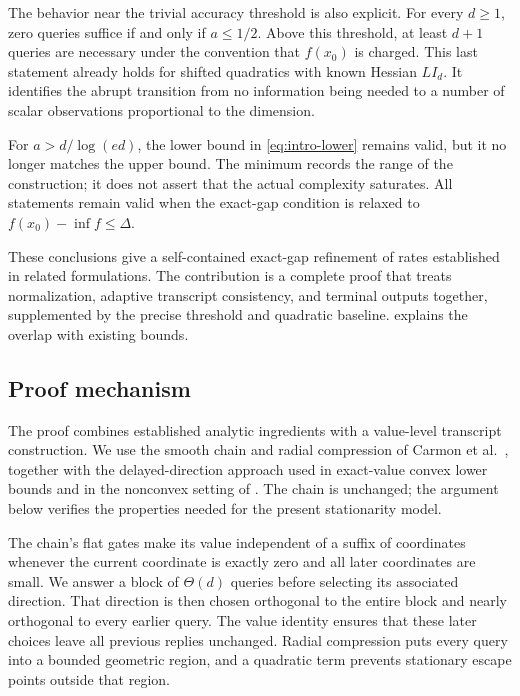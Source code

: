 \documentclass[11pt]{article}
\numberwithin{equation}{section}
\theoremstyle{definition}
\theoremstyle{remark}
\begin{document}
The behavior near the trivial accuracy threshold is also explicit. For
every $d\geq1$, zero queries suffice if and only if $a\leq1/2$. Above
this threshold, at least $d+1$ queries are necessary under the convention
that $f(x_0)$ is charged. This last statement already holds for shifted
quadratics with known Hessian $LI_d$. It identifies the abrupt transition
from no information being needed to a number of scalar observations
proportional to the dimension.

For $a>d/\log(ed)$, the lower bound in \eqref{eq:intro-lower} remains
valid, but it no longer matches the upper bound. The minimum records the
range of the construction; it does not assert that the actual complexity
saturates. All statements remain valid when the exact-gap condition is
relaxed to $f(x_0)-\inf f\leq\Delta$.

These conclusions give a self-contained exact-gap refinement of rates
established in related formulations. The contribution is a complete proof
that treats normalization, adaptive transcript consistency, and terminal
outputs together, supplemented by the precise threshold and quadratic
baseline.  explains the overlap with existing bounds.

\subsection{Proof mechanism}

The proof combines established analytic ingredients with a value-level
transcript construction. We use the smooth chain and radial compression
of Carmon et al.~\cite{CDHS2020}, together with the delayed-direction
approach used in exact-value convex lower bounds
\cite{WuEtAl2026Convex,WuEtAl2026SC} and in the nonconvex setting of
\citet{PTJ2026}. The chain is unchanged; the argument
below verifies the properties needed for the present stationarity model.

The chain's flat gates make its value independent of a suffix of
coordinates whenever the current coordinate is exactly zero and all
later coordinates are small. We answer a block of $\Theta(d)$ queries
before selecting its associated direction. That direction is then chosen
orthogonal to the entire block and nearly orthogonal to every earlier
query. The value identity ensures that these later choices leave all
previous replies unchanged. Radial compression puts every query into a
bounded geometric region, and a quadratic term prevents stationary escape
points outside that region.
\end{document}
